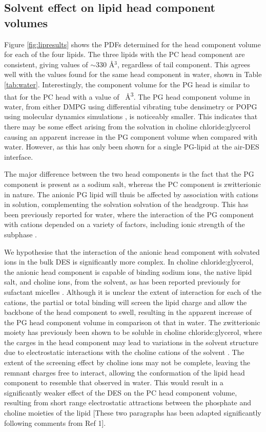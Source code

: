 \documentclass[amsmath,amssymb,twocolumn,superscriptaddress]{revtex4-1}
\begin{document}
\subsection{Solvent effect on lipid head component volumes}
%
Figure \ref{fig:lipresults} shows the PDFs determined for the head component volume for each of the four lipids.
The three lipids with the PC head component are consistent, giving values of $\sim330$ \AA$^3$, regardless of tail component.
This agrees well with the values found for the same head component in water, shown in Table \ref{tab:water}.
Interestingly, the component volume for the PG head is similar to that for the PC head with a value of ~\si{\angstrom\cubed}.
The PG head component volume in water, from either DMPG using differential vibrating tube densimetry \cite{pan_molecular_2012} or POPG using molecular dynamics simulations \cite{kucerka_scattering_2012}, is noticeably smaller.
This indicates that there may be some effect arising from the solvation in choline chloride:glycerol causing an apparent increase in the PG component volume when compared with water.
However, as this has only been shown for a single PG-lipid at the air-DES interface.

The major difference between the two head components is the fact that the PG component is present as a sodium salt, whereas the PC component is zwitterionic in nature.
The anionic PG lipid will thuis be affected by association with cations in solution, complementing the solvation solvation of the headgroup.
This has been previously reported for water, where the interaction of the PG component with cations depended on a variety of factors, including ionic strength of the subphase \cite{grigoriev_effect_1999}.

We hypothesise that the interaction of the anionic head component with solvated ions in the bulk DES is significantly more complex.
In choline chloride:glycerol, the anionic head component is capable of binding sodium ions, the native lipid salt, and choline ions, from the solvent, as has been reported previously for sufactant micelles \cite{sanchez-fernandez_counterion_2018}.
Although it is unclear the extent of interaction for each of the cations, the partial or total binding will screen the lipid charge and allow the backbone of the head component to swell, resulting in the apparent increase of the PG head component volume in comparison ot that in water.
The zwitterionic moiety has previously been shown to be soluble in choline chloride:glycerol, where the carges in the head component may lead to variations in the solvent structure due to electrostatic interactions with the choline cations of the solvent \cite{bryant_effect_2017,sanchez-fernandez_self-assembly_2018}.
The extent of the screening effect by choline ions may not be complete, leaving the remnant charges free to interact, allowing the conformation of the lipid head component to resemble that observed in water.
This would result in a significantly weaker effect of the DES on the PC head component volume, resulting from short range electrostatic attractions between the phosphate and choline moieties of the lipid [These two paragraphs has been adapted significantly following comments from Ref 1].
\end{document}
